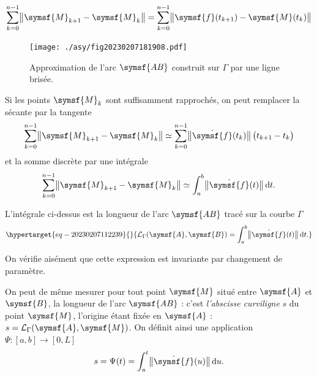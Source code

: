 \documentclass[
  a4paper,
  DIV=11,
  numbers=noendperiod]{scrreprt}
\newcommand{\D}{{\mathrm d}}
\newcommand{\point}[1]{\symsf{#1}}
\begin{document}
\[
\sum _ {k = 0} ^ {n - 1} \bigl \lVert \point{M} _ {k+1} - \point{M} _ k \bigr \rVert
= \sum _ {k = 0} ^ {n - 1} \bigl \lVert  \point{f}(t _ {k+1}) - \point{M}(t _ k) \bigr \rVert
\]

\begin{figure}

{\centering \texttt{[image: ./asy/fig20230207181908.pdf]}

}

\caption{\label{fig-20230207181908}Approximation de l'arc \(\point{AB}\)
construit sur \(\Gamma\) par une ligne brisée.}

\end{figure}

Si les points \(\point{M}_k\) sont suffisamment rapprochés, on peut
remplacer la sécante par la tangente \[
\sum _ {k = 0} ^ {n - 1} \bigl \lVert \point{M} _ {k+1} - \point{M} _ k \bigr \rVert
\simeq \sum _ {k = 0} ^ {n - 1} \bigl \lVert \dot{\point{f}}(t _ k) \bigr \rVert \, \bigl ( t _ {k+1} - t _ k \bigr)
\] et la somme discrète par une intégrale \[
\sum _ {k = 0} ^ {n - 1} \bigl \lVert \point{M} _ {k+1} - \point{M} _ k \bigr \rVert
\simeq \int _ {a} ^ {b} \bigl \lVert  \dot{\point{f}}(t) \bigr \rVert \, \D t.
\]

L'intégrale ci-dessus est la longueur de l'arc \(\point{AB}\) tracé sur
la courbe \(\Gamma\)
\begin{equation}\protect\hypertarget{eq-20230207112239}{}{
\mathcal{L} _ \Gamma(\point{A}, \point{B}) = \int _ {a} ^ {b} \bigl \lVert  \dot{\point{f}}(t) \bigr \rVert \, \D t.
}\label{eq-20230207112239}\end{equation}

\begin{tcolorbox}[enhanced jigsaw, toptitle=1mm, title=\textcolor{quarto-callout-note-color}{\faInfo}\hspace{0.5em}{Note}, colbacktitle=quarto-callout-note-color!10!white, toprule=.15mm, left=2mm, bottomrule=.15mm, arc=.35mm, breakable, opacityback=0, colframe=quarto-callout-note-color-frame, bottomtitle=1mm, titlerule=0mm, leftrule=.75mm, opacitybacktitle=0.6, coltitle=black, rightrule=.15mm, colback=white]

On vérifie aisément que cette expression est invariante par changement
de paramètre.

\end{tcolorbox}

On peut de même mesurer pour tout point \(\point{M}\) situé entre
\(\point{A}\) et \(\point{B}\), la longueur de l'arc \(\point{AB}\) :
c'est \emph{l'abscisse curviligne} \(s\) du point \(\point{M}\),
l'origine étant fixée en \(\point{A}\) :
\(s = \mathcal{L}_\Gamma(\point{A}, \point{M})\). On définit ainsi une
application \(\Psi \colon [a, b] \longrightarrow [0, L]\) \[
 s = \Psi(t) = \int_a^t \bigl \lVert  \dot{\point{f}}(u) \bigr \rVert \, \D u.
\]
\end{document}

